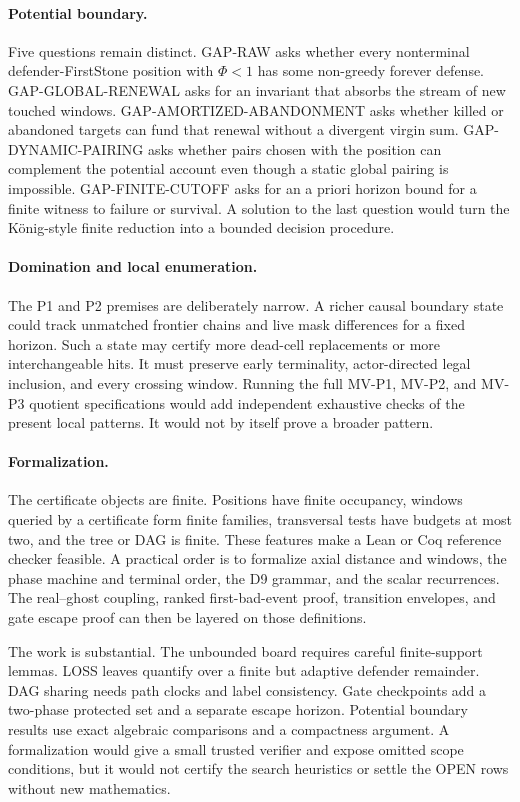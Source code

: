 \paragraph{Potential boundary.}
Five questions remain distinct.  GAP-RAW asks whether every nonterminal
defender-FirstStone position with $\Phi<1$ has some non-greedy forever
defense.  GAP-GLOBAL-RENEWAL asks for an invariant that absorbs the stream of
new touched windows.  GAP-AMORTIZED-ABANDONMENT asks whether killed or
abandoned targets can fund that renewal without a divergent virgin sum.
GAP-DYNAMIC-PAIRING asks whether pairs chosen with the position can complement
the potential account even though a static global pairing is impossible.
GAP-FINITE-CUTOFF asks for an a priori horizon bound for a finite witness to
failure or survival.  A solution to the last question would turn the
K\"onig-style finite reduction into a bounded decision procedure.

\paragraph{Domination and local enumeration.}
The P1 and P2 premises are deliberately narrow.  A richer causal boundary
state could track unmatched frontier chains and live mask differences for a
fixed horizon.  Such a state may certify more dead-cell replacements or more
interchangeable hits.  It must preserve early terminality, actor-directed
legal inclusion, and every crossing window.  Running the full MV-P1, MV-P2,
and MV-P3 quotient specifications would add independent exhaustive checks of
the present local patterns.  It would not by itself prove a broader pattern.

\paragraph{Formalization.}
The certificate objects are finite.  Positions have finite occupancy,
windows queried by a certificate form finite families, transversal tests have
budgets at most two, and the tree or DAG is finite.  These features make a
Lean or Coq reference checker feasible.  A practical order is to formalize
axial distance and windows, the phase machine and terminal order, the D9
grammar, and the scalar recurrences.  The real--ghost coupling, ranked
first-bad-event proof, transition envelopes, and gate escape proof can then be
layered on those definitions.

The work is substantial.  The unbounded board requires careful finite-support
lemmas.  LOSS leaves quantify over a finite but adaptive defender remainder.
DAG sharing needs path clocks and label consistency.  Gate checkpoints add a
two-phase protected set and a separate escape horizon.  Potential boundary
results use exact algebraic comparisons and a compactness argument.  A
formalization would give a small trusted verifier and expose omitted scope
conditions, but it would not certify the search heuristics or settle the OPEN
rows without new mathematics.
